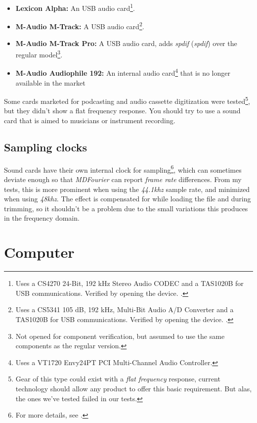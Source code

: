 \documentclass[10pt,a4paper]{report}
\newcommand{\define}[1]{\textit{\acrlong{#1}} (\textit{\acrshort{#1}})}
\newcommand{\khz}[1]{\textit{#1\acrshort{khz}}}
\begin{document}
\begin{appendices}
\begin{itemize}
	\item \textbf{Lexicon Alpha:} An USB audio card\footnote{Uses a CS4270 24-Bit, 192 kHz Stereo Audio CODEC and a TAS1020B for USB communications. Verified by opening the device. \cite{lexicon}.}. 
	\item \textbf{M-Audio M-Track:} A USB audio card\footnote{Uses a CS5341  105 dB, 192 kHz, Multi-Bit Audio A/D Converter and a TAS1020B for USB communications. Verified by opening the device. \cite{maudiomtrack}.}. 
	\item \textbf{M-Audio M-Track Pro:} A USB audio card, adds \define{spdif} over the regular model\footnote{Not opened for component verification, but assumed to use the same components as the regular version.}. \cite{maudiomtrack}
	\item \textbf{M-Audio Audiophile 192:} An internal audio card\footnote{Uses a VT1720 Envy24PT PCI Multi-Channel Audio Controller.} that is no longer available in the market \cite{maudio}
\end{itemize}

Some cards marketed for podcasting and audio cassette digitization were tested\footnote{Gear of this type could exist with a \textit{flat frequency} response, current technology should allow any product to offer this basic requirement. But alas, the ones we've tested failed in our tests.}, but they didn't show a flat frequency response. You should try to use a sound card that is aimed to musicians or instrument recording.

\subsection{Sampling clocks}
\label{samplingclocks}

Sound cards have their own internal clock for sampling\footnote{For more details, see \cite{SoundCardClock} \cite{soundcardtiming} \cite{gwsoundcardtiming}.}, which can sometimes deviate enough so that \textit{MDFourier} can report \textit{frame rate} differences. From my tests, this is more prominent when using the \khz{44.1} sample rate, and minimized when using \khz{48}. The effect is compensated for while loading the file and during trimming, so it shouldn't be a problem  due to the small variations this produces in the frequency domain. 

\section{Computer}


\end{appendices}
\end{document}

